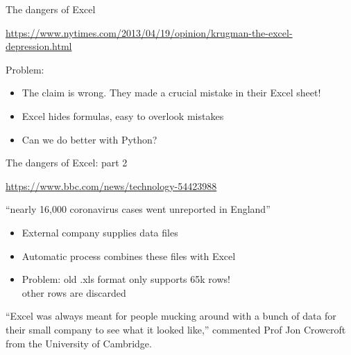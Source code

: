 \documentclass[aspectratio=169,usenames,dvipsnames]{beamer}
\begin{document}
\begin{frame}{The dangers of Excel}
    \begin{reference}
    \url{https://www.nytimes.com/2013/04/19/opinion/krugman-the-excel-depression.html}
    \end{reference}

    Problem:
    \begin{itemize}
        \item The claim is wrong.
            They made a crucial mistake in their Excel sheet!
        \item Excel hides formulas, easy to overlook mistakes
        \item Can we do better with Python?
    \end{itemize}

\end{frame}

\begin{frame}{The dangers of Excel: part 2}
    \begin{reference}
    \url{https://www.bbc.com/news/technology-54423988}   
    \end{reference}

    ``nearly 16,000 coronavirus cases went unreported in England''

    \begin{itemize}
        \item External company supplies data files
        \item Automatic process combines these files with Excel
        \item Problem: old .xls format only supports 65k rows! \\
            other rows are  discarded
    \end{itemize}

    \pause\vspace{1em}
    ``Excel was always meant for people mucking around with a bunch of data for
    their small company to see what it looked like,''
    commented Prof Jon Crowcroft from the University of Cambridge.

\end{frame}
\end{document}
